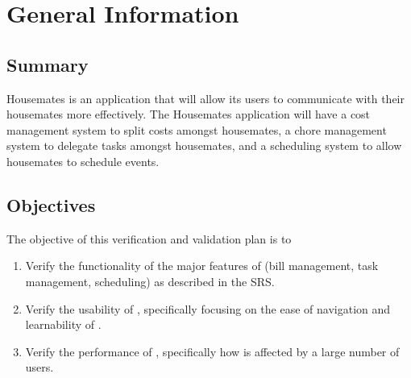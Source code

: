\documentclass[12pt, titlepage]{article}
\begin{document}



\newpage



\section{General Information}

\subsection{Summary}

 Housemates is an application that will allow its users to communicate with their housemates more effectively. The Housemates application will have a cost management system to split costs amongst housemates, a chore management system to delegate tasks amongst housemates, and a scheduling system to allow housemates to schedule events.


\subsection{Objectives}

The objective of this verification and validation plan is to
\begin{enumerate}
    \item Verify the functionality of the major features of \progname{} (bill management, task management, scheduling) as described in the SRS.
    \item Verify the usability of \progname{}, specifically focusing on the ease of navigation and learnability of \progname{}.
    \item Verify the performance of \progname{}, specifically how \progname{} is affected by a large number of users.
\end{enumerate}
\end{document}
